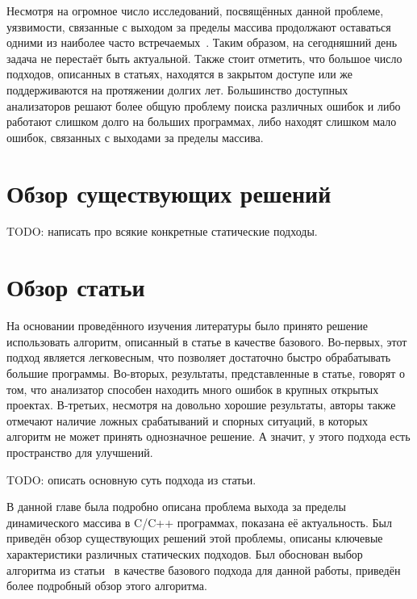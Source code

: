 Несмотря на огромное число исследований, посвящённых данной проблеме,
уязвимости, связанные с выходом за пределы массива продолжают
оставаться одними из наиболее часто встречаемых~\cite{uscert}. Таким
образом, на сегодняшний день задача не перестаёт быть
актуальной. Также стоит отметить, что большое число подходов,
описанных в статьях, находятся в закрытом доступе или же
поддерживаются на протяжении долгих лет. Большинство доступных
анализаторов решают более общую проблему поиска различных ошибок и
либо работают слишком долго на больших программах, либо находят
слишком мало ошибок, связанных с выходами за пределы массива.

\section{Обзор существующих решений}

TODO: написать про всякие конкретные статические подходы.

\section{Обзор статьи~\cite{li2010practical}}

На основании проведённого изучения литературы было принято решение
использовать алгоритм, описанный в статье \cite{li2010practical} в
качестве базового. Во-первых, этот подход является легковесным, что
позволяет достаточно быстро обрабатывать большие программы. Во-вторых,
результаты, представленные в статье, говорят о том, что анализатор
способен находить много ошибок в крупных открытых проектах. В-третьих,
несмотря на довольно хорошие результаты, авторы также отмечают наличие
ложных срабатываний и спорных ситуаций, в которых алгоритм не может
принять однозначное решение. А значит, у этого подхода есть
пространство для улучшений.

TODO: описать основную суть подхода из статьи.

\chapterconclusion

В данной главе была подробно описана проблема выхода за пределы
динамического массива в C/C++ программах, показана её
актуальность. Был приведён обзор существующих решений этой проблемы,
описаны ключевые характеристики различных статических подходов. Был
обоснован выбор алгоритма из статьи~\cite{li2010practical} в качестве
базового подхода для данной работы, приведён более подробный обзор
этого алгоритма.
